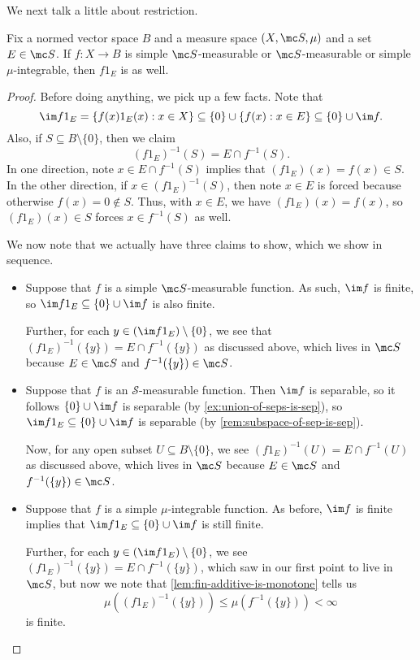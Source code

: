 \documentclass[../notes.tex]{subfiles}
\begin{document}
We next talk a little about restriction.
\begin{lemma} \label{lem:restrict-meas-functions}
	Fix a normed vector space $B$ and a measure space $(X,\mc S,\mu)$ and a set $E\in\mc S$. If $f\colon X\to B$ is simple $\mc S$-measurable or $\mc S$-measurable or simple $\mu$-integrable, then $f1_E$ is as well.
\end{lemma}
\begin{proof}
	Before doing anything, we pick up a few facts. Note that
	\[\im f1_E=\{f(x)1_E(x):x\in X\}\subseteq\{0\}\cup\{f(x):x\in E\}\subseteq\{0\}\cup\im f.\]
	Also, if $S\subseteq B\setminus\{0\}$, then we claim
	\[(f1_E)^{-1}(S)=E\cap f^{-1}(S).\]
	In one direction, note $x\in E\cap f^{-1}(S)$ implies that $(f1_E)(x)=f(x)\in S$. In the other direction, if $x\in(f1_E)^{-1}(S)$, then note $x\in E$ is forced because otherwise $f(x)=0\notin S$. Thus, with $x\in E$, we have $(f1_E)(x)=f(x)$, so $(f1_E)(x)\in S$ forces $x\in f^{-1}(S)$ as well.

	We now note that we actually have three claims to show, which we show in sequence.
	\begin{itemize}
		\item Suppose that $f$ is a simple $\mc S$-measurable function. As such, $\im f$ is finite, so $\im f1_E\subseteq\{0\}\cup\im f$ is also finite.
		
		Further, for each $y\in(\im f1_E)\setminus\{0\}$, we see that $(f1_E)^{-1}(\{y\})=E\cap f^{-1}(\{y\})$ as discussed above, which lives in $\mc S$ because $E\in\mc S$ and $f^{-1}(\{y\})\in\mc S$.
		\item Suppose that $f$ is an $\mathcal S$-measurable function. Then $\im f$ is separable, so it follows $\{0\}\cup\im f$ is separable (by \autoref{ex:union-of-seps-is-sep}), so $\im f1_E\subseteq\{0\}\cup\im f$ is separable (by \autoref{rem:subspace-of-sep-is-sep}).

		Now, for any open subset $U\subseteq B\setminus\{0\}$, we see $(f1_E)^{-1}(U)=E\cap f^{-1}(U)$ as discussed above, which lives in $\mc S$ because $E\in\mc S$ and $f^{-1}(\{y\})\in\mc S$.
		\item Suppose that $f$ is a simple $\mu$-integrable function. As before, $\im f$ is finite implies that $\im f1_E\subseteq\{0\}\cup\im f$ is still finite.

		Further, for each $y\in(\im f1_E)\setminus\{0\}$, we see $(f1_E)^{-1}(\{y\})=E\cap f^{-1}(\{y\})$, which saw in our first point to live in $\mc S$, but now we note that \autoref{lem:fin-additive-is-monotone} tells us
		\[\mu\left((f1_E)^{-1}(\{y\})\right)\le\mu\left(f^{-1}(\{y\})\right)<\infty\]
		is finite.
		\qedhere
	\end{itemize}
\end{proof}
\end{document}
